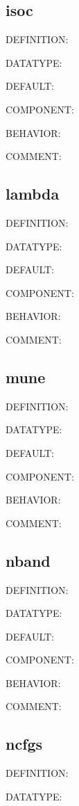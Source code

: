 \subsection{isoc}
{\color{red}DEFINITION:}

{\color{green}DATATYPE:}

{\color{blue}DEFAULT:}

{\color{brown}COMPONENT:}

{\color{purple}BEHAVIOR:}

{\color{olive}COMMENT:}

\subsection{lambda}
{\color{red}DEFINITION:}

{\color{green}DATATYPE:}

{\color{blue}DEFAULT:}

{\color{brown}COMPONENT:}

{\color{purple}BEHAVIOR:}

{\color{olive}COMMENT:}

\subsection{mune}
{\color{red}DEFINITION:}

{\color{green}DATATYPE:}

{\color{blue}DEFAULT:}

{\color{brown}COMPONENT:}

{\color{purple}BEHAVIOR:}

{\color{olive}COMMENT:}

\subsection{nband}
{\color{red}DEFINITION:}

{\color{green}DATATYPE:}

{\color{blue}DEFAULT:}

{\color{brown}COMPONENT:}

{\color{purple}BEHAVIOR:}

{\color{olive}COMMENT:}

\subsection{ncfgs}
{\color{red}DEFINITION:}

{\color{green}DATATYPE:}

